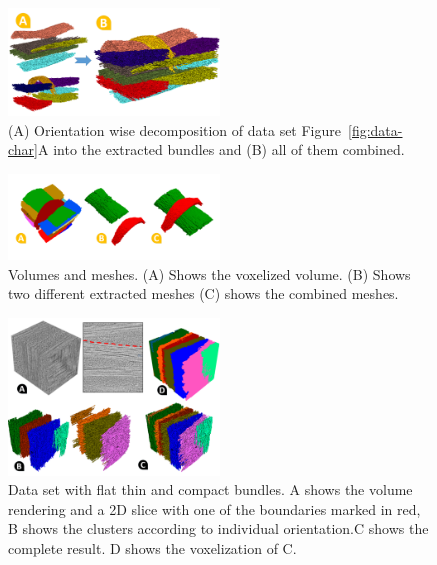 %	


\begin{figure}[h]
\centering
	\includegraphics[width=0.5\textwidth]{imagesMT2014/all_clusters.PNG}
	\caption{(A) Orientation wise decomposition of data set Figure~\ref{fig:data-char}A into the extracted bundles and (B) all of them combined.}
	\label{fig:crop-16-decomp}
\end{figure}
\begin{figure}[h]
  \centering
   \includegraphics[width=0.5\textwidth]{imagesMT2014/mesh_2_C.png}
   \caption{Volumes and  meshes. (A) Shows the voxelized volume. (B) Shows two different extracted meshes (C) shows the combined meshes.}
   \label{fig:mesh}
   \end{figure}
\begin{figure}
\centering
	\includegraphics[width=0.5\textwidth]{imagesMT2014/crop-6-J_2.PNG}
	\caption{Data set with flat thin and compact bundles. A shows the volume rendering and a 2D slice with one of the boundaries marked in red, B shows the clusters according to individual orientation.C shows the complete result. D shows the voxelization of C.}
	\label{fig:prepreg}
\end{figure}
